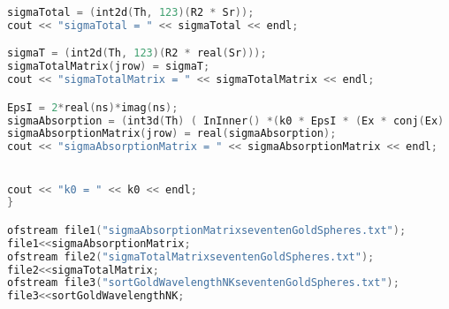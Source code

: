 \begin{lstlisting}[language=C]
sigmaTotal = (int2d(Th, 123)(R2 * Sr));
cout << "sigmaTotal = " << sigmaTotal << endl;

sigmaT = (int2d(Th, 123)(R2 * real(Sr)));
sigmaTotalMatrix(jrow) = sigmaT;
cout << "sigmaTotalMatrix = " << sigmaTotalMatrix << endl;

EpsI = 2*real(ns)*imag(ns);
sigmaAbsorption = (int3d(Th) ( InInner() *(k0 * EpsI * (Ex * conj(Ex)  +   Ey * conj(Ey) +   Ez * conj(Ez)))));
sigmaAbsorptionMatrix(jrow) = real(sigmaAbsorption);
cout << "sigmaAbsorptionMatrix = " << sigmaAbsorptionMatrix << endl;		 


cout << "k0 = " << k0 << endl;
}

ofstream file1("sigmaAbsorptionMatrixseventenGoldSpheres.txt");
file1<<sigmaAbsorptionMatrix;
ofstream file2("sigmaTotalMatrixseventenGoldSpheres.txt");
file2<<sigmaTotalMatrix;
ofstream file3("sortGoldWavelengthNKseventenGoldSpheres.txt");
file3<<sortGoldWavelengthNK;
\end{lstlisting}